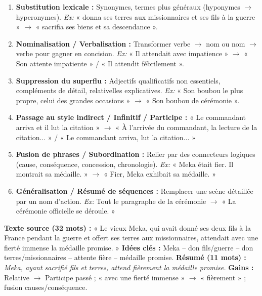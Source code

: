 \documentclass[11pt]{article}
\begin{document}
\begin{methode}
\begin{enumerate}
\item \textbf{Substitution lexicale :} Synonymes, termes plus généraux (hyponymes $\rightarrow$ hyperonymes). \textit{Ex:} « donna ses terres aux missionnaires et ses fils à la guerre » $\rightarrow$ « sacrifia ses biens et sa descendance ».
\item \textbf{Nominalisation / Verbalisation :} Transformer verbe $\rightarrow$ nom ou nom $\rightarrow$ verbe pour gagner en concision. \textit{Ex:} « Il attendait avec impatience » $\rightarrow$ « Son attente impatiente » / « Il attendit fébrilement ».
\item \textbf{Suppression du superflu :} Adjectifs qualificatifs non essentiels, compléments de détail, relativelles explicatives. \textit{Ex:} « Son boubou le plus propre, celui des grandes occasions » $\rightarrow$ « Son boubou de cérémonie ».
\item \textbf{Passage au style indirect / Infinitif / Participe :} « Le commandant arriva et il lut la citation » $\rightarrow$ « À l'arrivée du commandant, la lecture de la citation... » / « Le commandant arriva, lut la citation... »
\item \textbf{Fusion de phrases / Subordination :} Relier par des connecteurs logiques (cause, conséquence, concession, chronologie). \textit{Ex:} « Meka était fier. Il montrait sa médaille. » $\rightarrow$ « Fier, Meka exhibait sa médaille. »
\item \textbf{Généralisation / Résumé de séquences :} Remplacer une scène détaillée par un nom d'action. \textit{Ex:} Tout le paragraphe de la cérémonie $\rightarrow$ « La cérémonie officielle se déroule. »
\end{enumerate}
\end{methode}

\begin{exemplebox}
\textbf{Texte source (32 mots) :} « Le vieux Meka, qui avait donné ses deux fils à la France pendant la guerre et offert ses terres aux missionnaires, attendait avec une fierté immense la médaille promise. »
\textbf{Idées clés :} Meka -- don fils/guerre -- don terres/missionnaires -- attente fière -- médaille promise.
\textbf{Résumé (11 mots) :} \textit{Meka, ayant sacrifié fils et terres, attend fièrement la médaille promise.}
\textbf{Gains :} Relative $\rightarrow$ Participe passé ; « avec une fierté immense » $\rightarrow$ « fièrement » ; fusion causes/conséquence.
\end{exemplebox}
\end{document}
